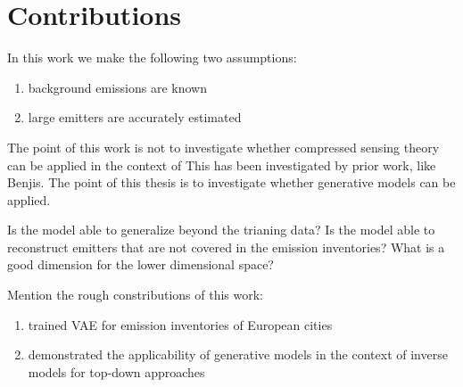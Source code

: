 \section{Contributions}
In this work we make the following two assumptions:
\begin{enumerate}
    \item background emissions are known
    \item large emitters are accurately estimated
\end{enumerate}

The point of this work is not to investigate whether compressed sensing theory can be applied in the context of 
This has been investigated by prior work, like Benjis.
The point of this thesis is to investigate whether generative models can be applied.

Is the model able to generalize beyond the trianing data?
Is the model able to reconstruct emitters that are not covered in the emission inventories? 
What is a good dimension for the lower dimensional space?

Mention the rough constributions of this work:
\begin{enumerate}
    \item trained VAE for emission inventories of European cities
    \item demonstrated the applicability of generative models in the context of inverse models for top-down approaches
\end{enumerate}
